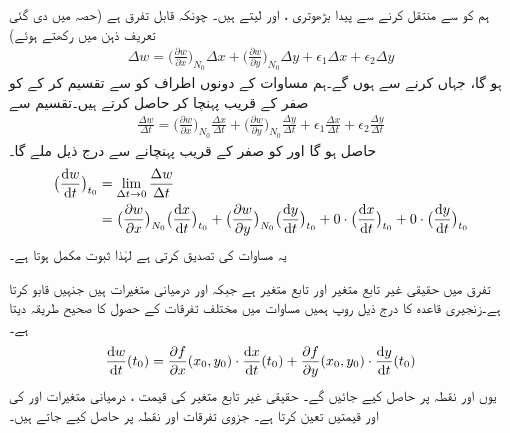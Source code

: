 ہم  کو  سے  منتقل کرنے سے پیدا بڑھوتری ،  اور  لیتے  ہیں۔ چونکہ  قابل تفرق ہے  (حصہ  میں دی گئی تعریف ذہن میں رکھتے ہوئے)
\begin{align}\label{مساوات_کثیرالمتغیر_زنجیری_دو_متغیرات_پ}
\Delta w=\big(\frac{\partial w}{\partial x}\big)_{N_0}\Delta x+\big(\frac{\partial w}{\partial y}\big)_{N_0}\Delta y+\epsilon_1\Delta x+\epsilon_2\Delta y
\end{align}
ہو گا، جہاں  کرنے سے  ہوں گے۔ہم مساوات  کے دونوں اطراف کو  سے تقسیم کر کے  کو صفر کے قریب پہنچا کر  حاصل کرتے ہیں۔تقسیم سے
\begin{align*}
\frac{\Delta w}{\Delta t}=\big(\frac{\partial w}{\partial x}\big)_{N_0}\frac{\Delta x}{\Delta t}+\big(\frac{\partial w}{\partial y}\big)_{N_0}\frac{\Delta y}{\Delta t}+\epsilon_1\frac{\Delta x}{\Delta t}+\epsilon_2\frac{\Delta y}{\Delta t}
\end{align*}
حاصل ہو گا اور  کو صفر کے قریب پہنچانے سے درج  ذیل ملے گا۔
\begin{align*}
\big(\frac{\dif w}{\dif t}\big)_{t_0}&=\lim_{\Delta t\to 0}\frac{\Delta w}{\Delta t}\\
&=\big(\frac{\partial w}{\partial x}\big)_{N_0}\big(\frac{\dif x}{\dif t}\big)_{t_0}+\big(\frac{\partial w}{\partial y}\big)_{N_0}\big(\frac{\dif y}{\dif t}\big)_{t_0}+0\cdot \big(\frac{\dif x}{\dif t}\big)_{t_0}+0\cdot \big(\frac{\dif y}{\dif t}\big)_{t_0}
\end{align*}
یہ مساوات  کی  تصدیق کرتی ہے لہٰذا ثبوت مکمل ہوتا ہے۔

تفرق  میں حقیقی غیر تابع متغیر  اور تابع متغیر  ہے جبکہ  اور   درمیانی متغیرات ہیں جنہیں  قابو کرتا ہے۔زنجیری قاعدہ کا  درج ذیل روپ ہمیں  مساوات  میں مختلف تفرقات کے حصول کا صحیح طریقہ دیتا ہے۔
\begin{align*}
\frac{\dif w}{\dif t}(t_0)=\frac{\partial f}{\partial x}(x_0,y_0)\cdot\frac{\dif x}{\dif t}(t_0)+\frac{\partial f}{\partial y}(x_0,y_0)\cdot\frac{\dif y}{\dif t}(t_0)
\end{align*} 
یوں  اور  نقطہ  پر حاصل کیے جائیں گے۔ حقیقی غیر تابع متغیر کی قیمت  ،  درمیانی متغیرات  اور  کی    اور  قیمتیں  تعین کرتا ہے۔ جزوی تفرقات  اور  نقطہ  پر حاصل کیے جاتے ہیں۔ 

